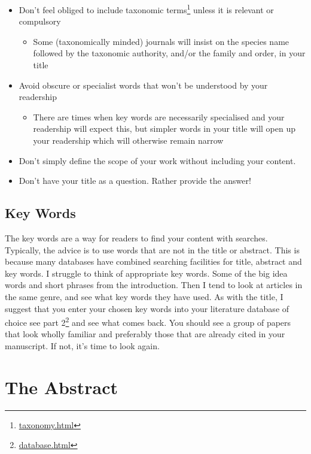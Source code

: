 \documentclass[
]{krantz}
\providecommand{\tightlist}{%
  \setlength{\itemsep}{0pt}\setlength{\parskip}{0pt}}
\renewcommand{\href}[2]{#2\footnote{\url{#1}}}
\begin{document}
\begin{itemize}
\tightlist
\item
  Don't feel obliged to include \href{taxonomy.html}{taxonomic terms} unless it is relevant or compulsory

  \begin{itemize}
  \tightlist
  \item
    Some (taxonomically minded) journals will insist on the species name followed by the taxonomic authority, and/or the family and order, in your title
  \end{itemize}
\item
  Avoid obscure or specialist words that won't be understood by your readership

  \begin{itemize}
  \tightlist
  \item
    There are times when key words are necessarily specialised and your readership will expect this, but simpler words in your title will open up your readership which will otherwise remain narrow
  \end{itemize}
\item
  Don't simply define the scope of your work without including your content.
\item
  Don't have your title as a question. Rather provide the answer!
\end{itemize}

\hypertarget{key-words}{%
\subsection{Key Words}\label{key-words}}

The key words are a way for readers to find your content with searches. Typically, the advice is to use words that are not in the title or abstract. This is because many databases have combined searching facilities for title, abstract and key words. I struggle to think of appropriate key words. Some of the big idea words and short phrases from the introduction. Then I tend to look at articles in the same genre, and see what key words they have used. As with the title, I suggest that you enter your chosen key words into your literature database of choice \href{database.html}{see part 2} and see what comes back. You should see a group of papers that look wholly familiar and preferably those that are already cited in your manuscript. If not, it's time to look again.

\hypertarget{abstract}{%
\section{The Abstract}\label{abstract}}
\end{document}
